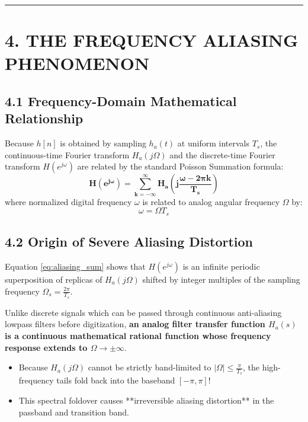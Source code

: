 \documentclass[11pt,a4paper]{article}
\begin{document}
\noindent\rule{\textwidth}{0.5pt}

\section{4. THE FREQUENCY ALIASING PHENOMENON}

\subsection{4.1 Frequency-Domain Mathematical Relationship}
Because $h[n]$ is obtained by sampling $h_a(t)$ at uniform intervals $T_s$, the continuous-time Fourier transform $H_a(j\Omega)$ and the discrete-time Fourier transform $H(e^{j\omega})$ are related by the standard Poisson Summation formula:
\begin{equation}
\mathbf{H(e^{j\omega}) = \sum_{k=-\infty}^\infty H_a\left( j \frac{\omega - 2\pi k}{T_s} \right)}
\label{eq:aliasing_sum}
\end{equation}
where normalized digital frequency $\omega$ is related to analog angular frequency $\Omega$ by:
\begin{equation}
\omega = \Omega T_s
\end{equation}

\subsection{4.2 Origin of Severe Aliasing Distortion}
Equation \eqref{eq:aliasing_sum} shows that $H(e^{j\omega})$ is an infinite periodic superposition of replicas of $H_a(j\Omega)$ shifted by integer multiples of the sampling frequency $\Omega_s = \frac{2\pi}{T_s}$.

Unlike discrete signals which can be passed through continuous anti-aliasing lowpass filters before digitization, \textbf{an analog filter transfer function $H_a(s)$ is a continuous mathematical rational function whose frequency response extends to $\Omega \to \pm\infty$}. 
\begin{itemize}
    \item Because $H_a(j\Omega)$ cannot be strictly band-limited to $|\Omega| \le \frac{\pi}{T_s}$, the high-frequency tails fold back into the baseband $[-\pi, \pi]$!
    \item This spectral foldover causes **irreversible aliasing distortion** in the passband and transition band.
\end{itemize}
\end{document}
